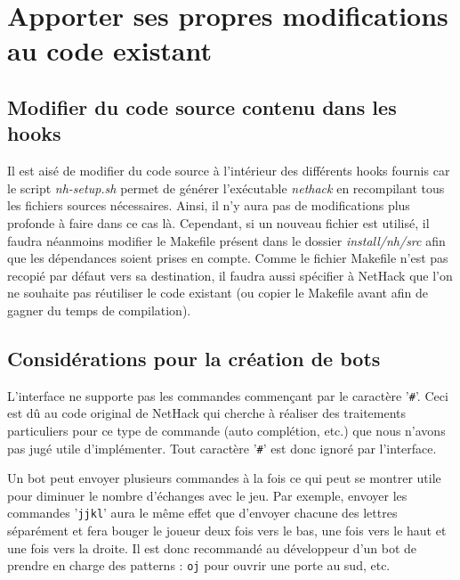 \documentclass[10pt,a4paper]{report}
\begin{document}
\chapter{Apporter ses propres modifications au code existant}
\section{Modifier du code source contenu dans les hooks}
Il est aisé de modifier du code source à l'intérieur des différents hooks
fournis car le script \emph{nh-setup.sh} permet de générer l'exécutable
\emph{nethack} en recompilant tous les fichiers sources nécessaires. Ainsi, il n'y aura
pas de modifications plus profonde à faire dans ce cas là. Cependant, si un
nouveau fichier est utilisé, il faudra néanmoins modifier le Makefile présent
dans le dossier \emph{install/nh/src} afin que les dépendances soient prises en
compte. Comme le fichier Makefile n'est pas recopié par défaut vers sa
destination, il faudra aussi spécifier à NetHack que l'on ne souhaite pas
réutiliser le code existant (ou copier le Makefile avant afin de gagner du temps
de compilation).


\section{Considérations pour la création de bots} \label{sec:creer-bot}

L'interface ne supporte pas les commandes commençant par le caractère '\verb!#!'. Ceci est dû au code original de NetHack qui cherche à réaliser des traitements particuliers pour ce type de commande (auto complétion, etc.) que nous n'avons pas jugé utile d'implémenter. Tout caractère '\verb!#!' est donc ignoré par l'interface.

Un bot peut envoyer plusieurs commandes à la fois ce qui peut se montrer utile pour diminuer le nombre d'échanges avec le jeu. Par exemple, envoyer les commandes '\verb!jjkl!' aura le même effet que d'envoyer chacune des lettres séparément et fera bouger le joueur deux fois vers le bas, une fois vers le haut et une fois vers la droite. Il est donc recommandé au développeur d'un bot de prendre en charge des patterns : \verb!oj! pour ouvrir une porte au sud, etc.
\end{document}
